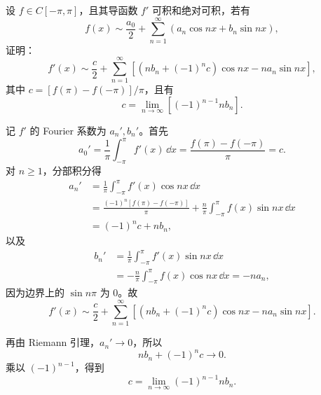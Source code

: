 \begin{xreferenceproblem}[15]
设 $f\in C[-\pi,\pi]$，且其导函数 $f'$ 可积和绝对可积，若有
  \[
    f(x)\sim\frac{a_0}{2}+\sum_{n=1}^{\infty}(a_n\cos nx+b_n\sin nx),
  \]
  证明：
  \[
    f'(x)\sim\frac c2+\sum_{n=1}^{\infty}[(nb_n+(-1)^nc)\cos nx-na_n\sin nx],
  \]
  其中 $c=[f(\pi)-f(-\pi)]/\pi$，且有
  \[
    c=\lim_{n\to\infty}[(-1)^{n-1}nb_n].
  \]
\end{xreferenceproblem}
\begin{xsolution}
记 $f'$ 的 Fourier 系数为 $a_n',b_n'$。首先
\[
  a_0'=\frac1\pi\int_{-\pi}^{\pi}f'(x)\,\dd x
  =\frac{f(\pi)-f(-\pi)}{\pi}=c.
\]
对 $n\ge1$，分部积分得
\begin{align*}
  a_n'
  &=\frac1\pi\int_{-\pi}^{\pi}f'(x)\cos nx\,\dd x\\
  &=\frac{(-1)^n[f(\pi)-f(-\pi)]}{\pi}
    +\frac n\pi\int_{-\pi}^{\pi}f(x)\sin nx\,\dd x\\
  &=(-1)^nc+nb_n,
\end{align*}
以及
\begin{align*}
  b_n'
  &=\frac1\pi\int_{-\pi}^{\pi}f'(x)\sin nx\,\dd x\\
  &=-\frac n\pi\int_{-\pi}^{\pi}f(x)\cos nx\,\dd x
  =-na_n,
\end{align*}
因为边界上的 $\sin n\pi$ 为 $0$。故
\[
  \boxed{\displaystyle
  f'(x)\sim\frac c2+
  \sum_{n=1}^{\infty}
  [(nb_n+(-1)^nc)\cos nx-na_n\sin nx]}.
\]

再由 Riemann 引理，$a_n'\to0$，所以
\[
  nb_n+(-1)^nc\to0.
\]
乘以 $(-1)^{n-1}$，得到
\[
  \boxed{\displaystyle
  c=\lim_{n\to\infty}(-1)^{n-1}nb_n }.
\]
\end{xsolution}


